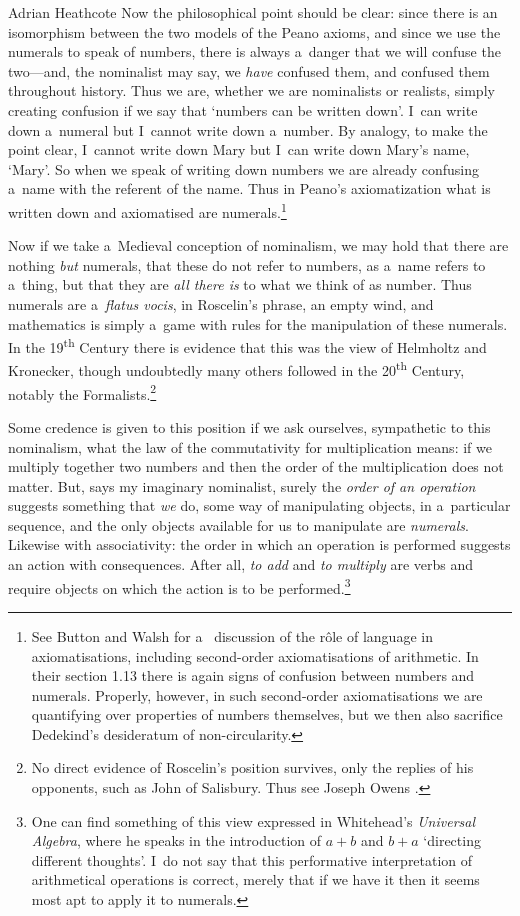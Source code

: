 \begin{artengenv}{Adrian Heathcote}
Now the philosophical point should be clear: since there is an isomorphism between the two models of the Peano axioms, and since we use the numerals to speak of numbers, there is always a~danger that we will confuse the two---and, the nominalist may say, we \emph{have} confused them, and confused them throughout history. Thus we are, whether we are nominalists or realists, simply creating confusion if we say that `numbers can be written down'. I~can write down a~numeral but I~cannot write down a~number. By analogy, to make the point clear, I~cannot write down Mary but I~can write down Mary's name, `Mary'. So when we speak of writing down numbers we are already confusing a~name with the referent of the name. Thus in Peano's axiomatization what is written down and axiomatised are numerals.\footnote{See Button and Walsh \parencite*{button_philosophy_2018} for a~ discussion of the rôle of language in axiomatisations, including second-order axiomatisations of arithmetic. In their section 1.13 there is again signs of confusion between numbers and numerals. Properly, however, in such second-order axiomatisations we are quantifying over properties of numbers themselves, but we then also sacrifice Dedekind's desideratum of non-circularity.}

Now if we take a~Medieval conception of nominalism, we may hold that there are nothing \textit{but} numerals, that these do not refer to numbers, as a~name refers to a~thing, but that they are \textit{all there is} to what we think of as number. Thus numerals are a~\textit{flatus vocis}, in Roscelin's phrase, an empty wind, and mathematics is simply a~game with rules for the manipulation of these numerals. In the 19\textsuperscript{th} Century there is evidence that this was the view of Helmholtz and Kronecker, though undoubtedly many others followed in the 20\textsuperscript{th} Century, notably the Formalists.\footnote{No direct evidence of Roscelin's position survives, only the replies of his opponents, such as John of Salisbury. Thus see Joseph Owens \parencite*{owens_faith_1982}.} 

Some credence is given to this position if we ask ourselves, sympathetic to this nominalism, what the law of the commutativity for multiplication means: if we multiply together two numbers  and  then the order of the multiplication does not matter. But, says my imaginary nominalist, surely the \textit{order of an operation} suggests something that \textit{we} do, some way of manipulating objects, in a~particular sequence, and the only objects available for us to manipulate are \textit{numerals}. Likewise with associativity: the order in which an operation is performed suggests an action with consequences. After all, \textit{to add} and \textit{to multiply} are verbs and require objects on which the action is to be performed.\footnote{One can find something of this view expressed in Whitehead's \textit{Universal Algebra}, where he speaks in the introduction of $a + b$ and $b + a$ `directing different thoughts'. I~do not say that this performative interpretation of arithmetical operations is correct, merely that if we have it then it seems most apt to apply it to numerals.}


\end{artengenv}
